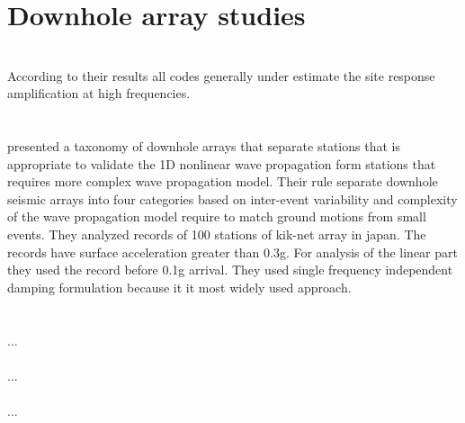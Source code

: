 \newpage
\section{Downhole array studies}
\noindent
\citet{Kwok2008}\\
According to their results all codes generally under estimate the site response amplification at high frequencies.\\
\\
\citet{Thompson2012} \\
presented a taxonomy of downhole arrays that separate stations that is appropriate to validate the 1D nonlinear wave propagation form stations that requires more complex wave propagation model. Their rule separate downhole seismic arrays into four categories based on inter-event variability and complexity of the wave propagation model require to match ground motions from small events. They analyzed records of 100 stations of kik-net array in japan. The records have surface acceleration greater than 0.3g. For analysis of the linear part they used the record before 0.1g arrival. They used single frequency independent damping formulation because it it most widely used approach.\\ 
\\
\citet{Steidl1996}\\
...\\
\citet{Kaklamanos2013}\\
...\\
\citet{Bradley2011}\\
...\\



